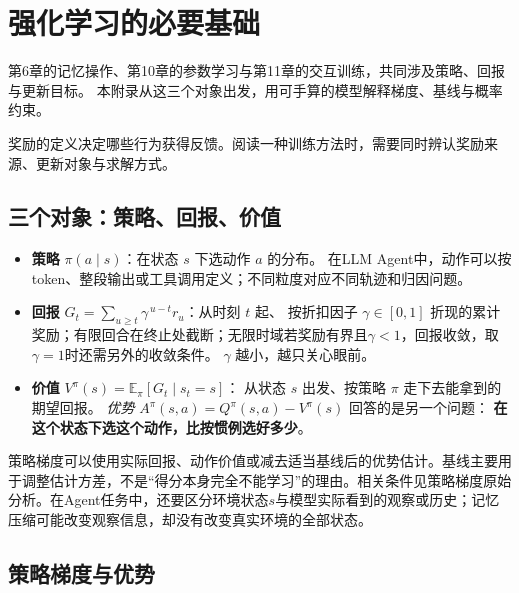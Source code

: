 \chapter{强化学习的必要基础}
\label{app:rl}

第6章的记忆操作、第10章的参数学习与第11章的交互训练，共同涉及策略、回报与更新目标。
本附录从这三个对象出发，用可手算的模型解释梯度、基线与概率约束。

奖励的定义决定哪些行为获得反馈。阅读一种训练方法时，需要同时辨认奖励来源、更新对象与求解方式。

\section{三个对象：策略、回报、价值}
\label{sec:appc-objects}

\begin{itemize}
  \item \textbf{策略} $\pi(a\mid s)$：在状态 $s$ 下选动作 $a$ 的分布。
        在LLM Agent中，动作可以按token、整段输出或工具调用定义；不同粒度对应不同轨迹和归因问题。
  \item \textbf{回报} $G_t=\sum_{u\ge t}\gamma^{\,u-t} r_u$：从时刻 $t$ 起、
        按折扣因子 $\gamma\in[0,1]$ 折现的累计奖励；有限回合在终止处截断；无限时域若奖励有界且$\gamma<1$，回报收敛，取$\gamma=1$时还需另外的收敛条件\cite{jitrl-2601}。
        $\gamma$ 越小，越只关心眼前。
  \item \textbf{价值} $V^{\pi}(s)=\mathbb E_{\pi}[G_t\mid s_t=s]$：
        从状态 $s$ 出发、按策略 $\pi$ 走下去能拿到的期望回报。
        \emph{优势} $A^{\pi}(s,a)=Q^{\pi}(s,a)-V^{\pi}(s)$ 回答的是另一个问题：
        \textbf{在这个状态下选这个动作，比按惯例选好多少}。
\end{itemize}

策略梯度可以使用实际回报、动作价值或减去适当基线后的优势估计。基线主要用于调整估计方差，不是“得分本身完全不能学习”的理由。相关条件见策略梯度原始分析\cite{policy-gradient-1999}。在Agent任务中，还要区分环境状态$s$与模型实际看到的观察或历史；记忆压缩可能改变观察信息，却没有改变真实环境的全部状态。

\section{策略梯度与优势}
\label{sec:appc-pg}

